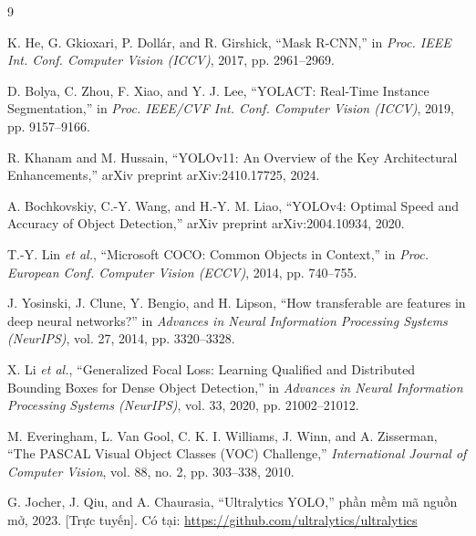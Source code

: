 \documentclass[11pt,a4paper]{article}
\begin{document}
\begin{thebibliography}{9}

K. He, G. Gkioxari, P. Dollár, and R. Girshick,
``Mask R-CNN,''
in \emph{Proc. IEEE Int. Conf. Computer Vision (ICCV)}, 2017, pp. 2961--2969.

D. Bolya, C. Zhou, F. Xiao, and Y. J. Lee,
``YOLACT: Real-Time Instance Segmentation,''
in \emph{Proc. IEEE/CVF Int. Conf. Computer Vision (ICCV)}, 2019, pp. 9157--9166.

R. Khanam and M. Hussain,
``YOLOv11: An Overview of the Key Architectural Enhancements,''
arXiv preprint arXiv:2410.17725, 2024.

A. Bochkovskiy, C.-Y. Wang, and H.-Y. M. Liao,
``YOLOv4: Optimal Speed and Accuracy of Object Detection,''
arXiv preprint arXiv:2004.10934, 2020.

T.-Y. Lin \emph{et al.},
``Microsoft COCO: Common Objects in Context,''
in \emph{Proc. European Conf. Computer Vision (ECCV)}, 2014, pp. 740--755.

J. Yosinski, J. Clune, Y. Bengio, and H. Lipson,
``How transferable are features in deep neural networks?''
in \emph{Advances in Neural Information Processing Systems (NeurIPS)}, vol. 27, 2014, pp. 3320--3328.

X. Li \emph{et al.},
``Generalized Focal Loss: Learning Qualified and Distributed Bounding Boxes for Dense Object
Detection,''
in \emph{Advances in Neural Information Processing Systems (NeurIPS)}, vol. 33, 2020, pp.
21002--21012.

M. Everingham, L. Van Gool, C. K. I. Williams, J. Winn, and A. Zisserman,
``The PASCAL Visual Object Classes (VOC) Challenge,''
\emph{International Journal of Computer Vision}, vol. 88, no. 2, pp. 303--338, 2010.

G. Jocher, J. Qiu, and A. Chaurasia,
``Ultralytics YOLO,'' phần mềm mã nguồn mở, 2023. [Trực tuyến]. Có tại:
\url{https://github.com/ultralytics/ultralytics}

\end{thebibliography}
\end{document}
